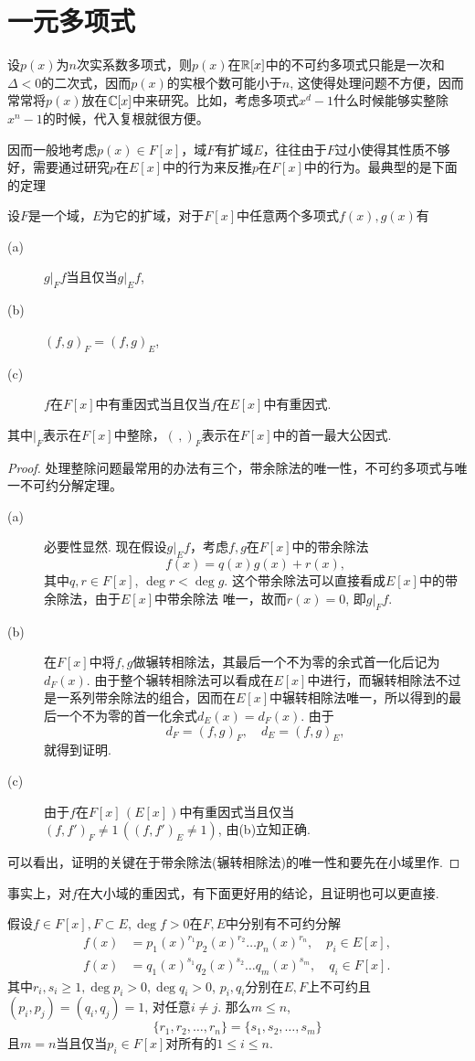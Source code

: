 \section{一元多项式}
设$p(x)$为$n$次实系数多项式，则$p(x)$在$\mathbb{R}[x]$中的不可约多项式只能是一次和$\Delta<0$的二次式，因而$p(x)$的实根个数可能小于$n$, 这使得处理问题不方便，因而常常将$p(x)$放在$\mathbb{C}[x]$中来研究。比如，考虑多项式$x^d-1$什么时候能够实整除$x^n-1$的时候，代入复根就很方便。

因而一般地考虑$p(x)\in F[x]$，域$F$有扩域$E$，往往由于$F$过小使得其性质不够好，需要通过研究$p$在$E[x]$中的行为来反推$p$在$F[x]$中的行为。最典型的是下面的定理
\begin{thm}
	设$F$是一个域，$E$为它的扩域，对于$F[x]$中任意两个多项式$f(x),g(x)$有
	\begin{description}
		\item[(a)] $g|_F f$当且仅当$g|_E f$,
		\item[(b)] $(f,g)_F=(f,g)_E$,
		\item[(c)] $f$在$F[x]$中有重因式当且仅当$f$在$E[x]$中有重因式.
	\end{description}
	其中$|_F$表示在$F[x]$中整除，$(\,,)_F$表示在$F[x]$中的首一最大公因式.
\end{thm}
\begin{proof}
	处理整除问题最常用的办法有三个，带余除法的唯一性，不可约多项式与唯一不可约分解定理。
	\begin{description}
		\item[(a)] 必要性显然. 现在假设$g|_E f$，考虑$f,g$在$F[x]$中的带余除法
		\[f(x)=q(x)g(x)+r(x),\]
		其中$q,r\in F[x]$, $\deg r<\deg g$. 这个带余除法可以直接看成$E[x]$中的带余除法，由于$E[x]$中带余除法
		唯一，故而$r(x)=0$, 即$g|_F f$.
		\item[(b)] 在$F[x]$中将$f,g$做辗转相除法，其最后一个不为零的余式首一化后记为$d_F(x)$. 由于整个辗转相除法可以看成在$E[x]$中进行，而辗转相除法不过是一系列带余除法的组合，因而在$E[x]$中辗转相除法唯一，所以得到的最后一个不为零的首一化余式$d_E(x)=d_F(x)$. 由于
		\[d_F=(f,g)_F,\quad d_E=(f,g)_E,\]
		就得到证明.
		\item[(c)] 由于$f$在$F[x]\,(E[x])$中有重因式当且仅当$(f,f')_F\neq 1\,((f,f')_E\neq 1)$, 由(b)立知正确.
	\end{description}
	可以看出，证明的关键在于带余除法(辗转相除法)的唯一性和要先在小域里作.
\end{proof}
事实上，对$f$在大小域的重因式，有下面更好用的结论，且证明也可以更直接.
\begin{thm}	
	假设$f\in F[x], F\subset E,\deg f>0$在$F,E$中分别有不可约分解
	\begin{align*}
		f(x)&=p_1(x)^{r_1} p_2(x)^{r_2}\dots p_n(x)^{r_n},\quad p_i\in E[x],\\
		f(x)&=q_1(x)^{s_1} q_2(x)^{s_2}\dots q_m(x)^{s_m},\quad q_i\in F[x].
	\end{align*}
	其中$r_i,s_i\geq 1,\deg p_i>0,\deg q_i>0$, $p_i,q_i$分别在$E,F$上不可约且$(p_i,p_j)=(q_i,q_j)=1$, 对任意$i\neq j$. 那么$m\leq n$,
	\[\{r_1,r_2,\dots,r_n\}=\{s_1,s_2,\dots,s_m\}\]
	且$m=n$当且仅当$p_i\in F[x]$对所有的$1\leq i\leq n$.
\end{thm}